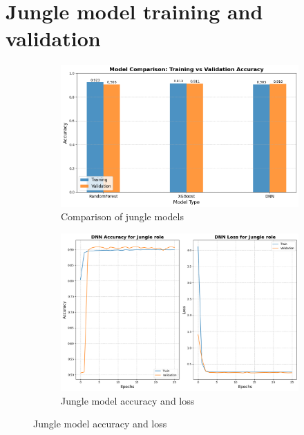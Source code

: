 \documentclass[12pt, a4paper]{article}
\begin{document}
\section{Jungle model training and validation}\label{sec:jungle_model_training}
\begin{figure}[!ht]
    \centering
    \begin{subfigure}[b]{0.8\textwidth}
        \centering
        \includegraphics[width=\textwidth]{figures/2_jungle_model_comparison.png}
        \caption{Comparison of jungle models}
    \end{subfigure}
    \begin{subfigure}[b]{0.8\textwidth}
        \centering
        \includegraphics[width=\textwidth]{figures/2_jungle_model_acc_loss.png}
        \caption{Jungle model accuracy and loss}
    \end{subfigure}
\end{figure}

\clearpage
\end{document}
